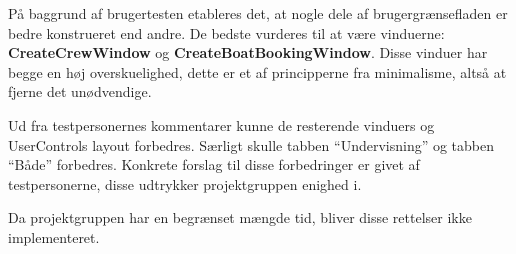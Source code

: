 På baggrund af brugertesten etableres det, at nogle dele af brugergrænsefladen er bedre konstrueret end andre.
De bedste vurderes til at være vinduerne: \textbf{CreateCrewWindow} og \textbf{CreateBoatBookingWindow}. 
Disse vinduer har begge en høj overskuelighed, dette er et af principperne fra minimalisme, altså at fjerne det unødvendige. 

Ud fra testpersonernes kommentarer kunne de resterende vinduers og UserControls layout forbedres. 
Særligt skulle tabben ``Undervisning'' og tabben ``Både'' forbedres.
Konkrete forslag til disse forbedringer er givet af testpersonerne, disse udtrykker projektgruppen enighed i. 

Da projektgruppen har en begrænset mængde tid, bliver disse rettelser ikke implementeret. 
